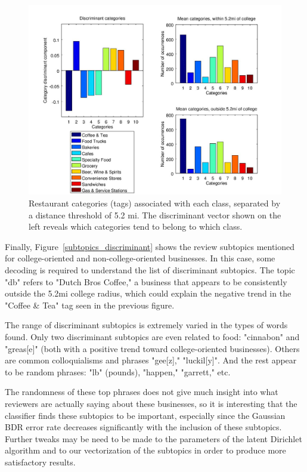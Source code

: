 \documentclass[10pt,twocolumn,letterpaper]{article}
\begin{document}
\begin{figure}[h]
  \centering{}\includegraphics[width=1\linewidth]{filtered_colleges_yes_subtopics/categories_discriminant}
  \caption{Restaurant categories (tags) associated with each class, separated
    by a distance threshold of 5.2 mi. The discriminant vector shown on the left
    reveals which categories tend to belong to which class.}
\label{categories_discriminant}
\end{figure}

Finally, Figure~\ref{subtopics_discriminant} shows the review subtopics
mentioned for college-oriented and non-college-oriented businesses. In this
case, some decoding is required to understand the list of discriminant
subtopics. The topic "db" refers to "Dutch Bros Coffee," a business that appears
to be consistently outside the 5.2mi college radius, which could explain the
negative trend in the "Coffee \& Tea" tag seen in the previous figure.

The range of discriminant subtopics is extremely varied in the types of words
found. Only two discriminant subtopics are even related to food: "cinnabon" and
"greas[e]" (both with a positive trend toward college-oriented businesses).
Others are common colloquialisms and phrases "gee[z]," "luckil[y]".  And the
rest appear to be random phrases: "lb" (pounds), "happen," "garrett," etc.

The randomness of these top phrases does not give much insight into what
reviewers are actually saying about these businesses, so it is interesting that
the classifier finds these subtopics to be important, especially since the
Gaussian BDR error rate decreases significantly with the inclusion of these
subtopics. Further tweaks may be need to be made to the parameters of the latent
Dirichlet algorithm and to our vectorization of the subtopics in order to
produce more satisfactory results.
\end{document}
